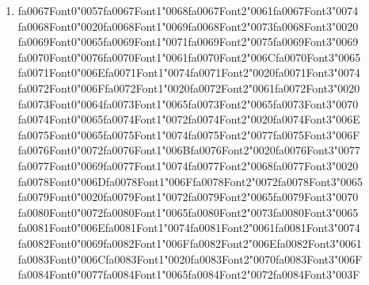 \documentclass[12pt]{article}
\begin{document}
\begin{enumerate}[label=Q\arabic*.]
\begin{enumerate}[label=(\Alph*)]
    \item Only the output weight V is reused
\end{enumerate}
\item {\csname fa0067Font0\endcsname\char"0057}{\csname fa0067Font1\endcsname\char"0068}{\csname fa0067Font2\endcsname\char"0061}{\csname fa0067Font3\endcsname\char"0074} {\csname fa0068Font0\endcsname\char"0020}{\csname fa0068Font1\endcsname\char"0069}{\csname fa0068Font2\endcsname\char"0073}{\csname fa0068Font3\endcsname\char"0020} {\csname fa0069Font0\endcsname\char"0065}{\csname fa0069Font1\endcsname\char"0071}{\csname fa0069Font2\endcsname\char"0075}{\csname fa0069Font3\endcsname\char"0069} {\csname fa0070Font0\endcsname\char"0076}{\csname fa0070Font1\endcsname\char"0061}{\csname fa0070Font2\endcsname\char"006C}{\csname fa0070Font3\endcsname\char"0065} {\csname fa0071Font0\endcsname\char"006E}{\csname fa0071Font1\endcsname\char"0074}{\csname fa0071Font2\endcsname\char"0020}{\csname fa0071Font3\endcsname\char"0074} {\csname fa0072Font0\endcsname\char"006F}{\csname fa0072Font1\endcsname\char"0020}{\csname fa0072Font2\endcsname\char"0061}{\csname fa0072Font3\endcsname\char"0020} {\csname fa0073Font0\endcsname\char"0064}{\csname fa0073Font1\endcsname\char"0065}{\csname fa0073Font2\endcsname\char"0065}{\csname fa0073Font3\endcsname\char"0070} {\csname fa0074Font0\endcsname\char"0065}{\csname fa0074Font1\endcsname\char"0072}{\csname fa0074Font2\endcsname\char"0020}{\csname fa0074Font3\endcsname\char"006E} {\csname fa0075Font0\endcsname\char"0065}{\csname fa0075Font1\endcsname\char"0074}{\csname fa0075Font2\endcsname\char"0077}{\csname fa0075Font3\endcsname\char"006F} {\csname fa0076Font0\endcsname\char"0072}{\csname fa0076Font1\endcsname\char"006B}{\csname fa0076Font2\endcsname\char"0020}{\csname fa0076Font3\endcsname\char"0077} {\csname fa0077Font0\endcsname\char"0069}{\csname fa0077Font1\endcsname\char"0074}{\csname fa0077Font2\endcsname\char"0068}{\csname fa0077Font3\endcsname\char"0020} {\csname fa0078Font0\endcsname\char"006D}{\csname fa0078Font1\endcsname\char"006F}{\csname fa0078Font2\endcsname\char"0072}{\csname fa0078Font3\endcsname\char"0065} {\csname fa0079Font0\endcsname\char"0020}{\csname fa0079Font1\endcsname\char"0072}{\csname fa0079Font2\endcsname\char"0065}{\csname fa0079Font3\endcsname\char"0070} {\csname fa0080Font0\endcsname\char"0072}{\csname fa0080Font1\endcsname\char"0065}{\csname fa0080Font2\endcsname\char"0073}{\csname fa0080Font3\endcsname\char"0065} {\csname fa0081Font0\endcsname\char"006E}{\csname fa0081Font1\endcsname\char"0074}{\csname fa0081Font2\endcsname\char"0061}{\csname fa0081Font3\endcsname\char"0074} {\csname fa0082Font0\endcsname\char"0069}{\csname fa0082Font1\endcsname\char"006F}{\csname fa0082Font2\endcsname\char"006E}{\csname fa0082Font3\endcsname\char"0061} {\csname fa0083Font0\endcsname\char"006C}{\csname fa0083Font1\endcsname\char"0020}{\csname fa0083Font2\endcsname\char"0070}{\csname fa0083Font3\endcsname\char"006F} {\csname fa0084Font0\endcsname\char"0077}{\csname fa0084Font1\endcsname\char"0065}{\csname fa0084Font2\endcsname\char"0072}{\csname fa0084Font3\endcsname\char"003F}

\end{enumerate}
\end{document}
